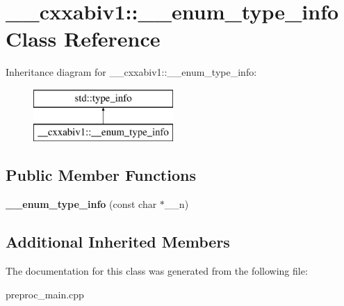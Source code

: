 \hypertarget{class____cxxabiv1_1_1____enum__type__info}{\section{\+\_\+\+\_\+cxxabiv1\+:\+:\+\_\+\+\_\+enum\+\_\+type\+\_\+info Class Reference}
\label{class____cxxabiv1_1_1____enum__type__info}
}
Inheritance diagram for \+\_\+\+\_\+cxxabiv1\+:\+:\+\_\+\+\_\+enum\+\_\+type\+\_\+info\+:\begin{figure}[H]
\begin{center}
\leavevmode
\includegraphics[height=2.000000cm]{class____cxxabiv1_1_1____enum__type__info}
\end{center}
\end{figure}
\subsection*{Public Member Functions}
\begin{DoxyCompactItemize}
\item 
\hypertarget{class____cxxabiv1_1_1____enum__type__info_a34fde6821af064d83e5828d7824af0ef}{{\bfseries \+\_\+\+\_\+enum\+\_\+type\+\_\+info} (const char $\ast$\+\_\+\+\_\+n)}\label{class____cxxabiv1_1_1____enum__type__info_a34fde6821af064d83e5828d7824af0ef}

\end{DoxyCompactItemize}
\subsection*{Additional Inherited Members}


The documentation for this class was generated from the following file\+:\begin{DoxyCompactItemize}
\item 
preproc\+\_\+main.\+cpp\end{DoxyCompactItemize}
